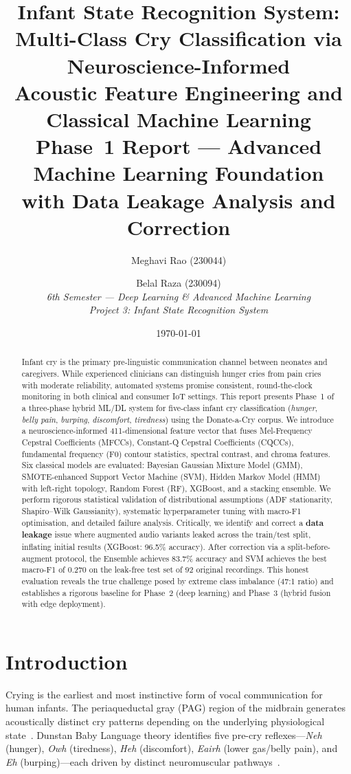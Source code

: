 \documentclass[11pt,a4paper]{article}
\title{%
  \textbf{Infant State Recognition System}:\\[4pt]
  \textbf{Multi-Class Cry Classification via Neuroscience-Informed}\\
  \textbf{Acoustic Feature Engineering and Classical Machine Learning}\\[10pt]
  \large Phase~1 Report --- Advanced Machine Learning Foundation\\
  \large with Data Leakage Analysis and Correction
}
\author{
  Meghavi Rao (230044) \and Belal Raza (230094) \\[4pt]
  \textit{6th Semester --- Deep Learning \& Advanced Machine Learning} \\
  \textit{Project 3: Infant State Recognition System}
}
\date{\today}
\begin{document}
\maketitle

\begin{abstract}
Infant cry is the primary pre-linguistic communication channel between
neonates and caregivers. While experienced clinicians can distinguish
hunger cries from pain cries with moderate reliability, automated
systems promise consistent, round-the-clock monitoring in both clinical
and consumer IoT settings. This report presents Phase~1 of a
three-phase hybrid ML/DL system for five-class infant cry
classification (\textit{hunger}, \textit{belly pain}, \textit{burping},
\textit{discomfort}, \textit{tiredness}) using the Donate-a-Cry corpus.
We introduce a neuroscience-informed 411-dimensional feature vector that
fuses Mel-Frequency Cepstral Coefficients (MFCCs), Constant-Q Cepstral
Coefficients (CQCCs), fundamental frequency (F0) contour statistics,
spectral contrast, and chroma features. Six classical models are
evaluated: Bayesian Gaussian Mixture Model (GMM), SMOTE-enhanced Support
Vector Machine (SVM), Hidden Markov Model (HMM) with left-right
topology, Random Forest (RF), XGBoost, and a stacking ensemble. We
perform rigorous statistical validation of distributional assumptions
(ADF stationarity, Shapiro--Wilk Gaussianity), systematic
hyperparameter tuning with macro-F1 optimisation, and detailed failure
analysis. Critically, we identify and correct a \textbf{data leakage}
issue where augmented audio variants leaked across the train/test split,
inflating initial results (XGBoost: 96.5\% accuracy). After correction
via a split-before-augment protocol, the Ensemble achieves 83.7\%
accuracy and SVM achieves the best macro-F1 of 0.270 on the
leak-free test set of 92 original recordings. This honest evaluation
reveals the true challenge posed by extreme class imbalance (47:1 ratio)
and establishes a rigorous baseline for Phase~2 (deep learning) and
Phase~3 (hybrid fusion with edge deployment).
\end{abstract}

\section{Introduction}
\label{sec:intro}

Crying is the earliest and most instinctive form of vocal communication
for human infants. The periaqueductal gray (PAG) region of the midbrain
generates acoustically distinct cry patterns depending on the underlying
physiological state~\cite{newman2007cry}. Dunstan Baby Language theory
identifies five pre-cry reflexes---\textit{Neh} (hunger),
\textit{Owh} (tiredness), \textit{Heh} (discomfort),
\textit{Eairh} (lower gas/belly pain), and \textit{Eh}
(burping)---each driven by distinct neuromuscular
pathways~\cite{dunstan2006}.
\end{document}
